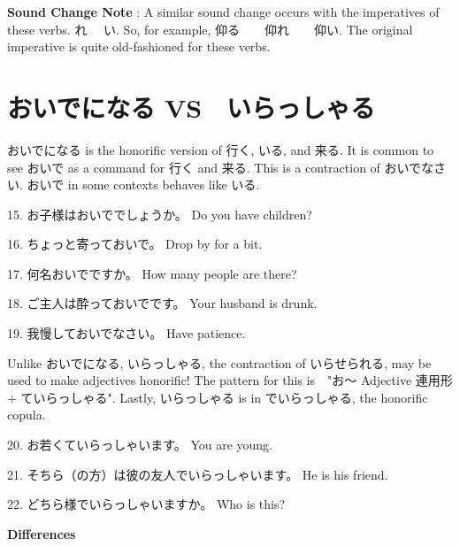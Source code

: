 \par{\textbf{Sound Change Note }: A similar sound change occurs with the imperatives of these verbs. れ \textrightarrow 　い. So, for example, 仰る　\textrightarrow 　仰れ　\textrightarrow 　仰い. The original imperative is quite old-fashioned for these verbs. }
      
\section{おいでになる VS　いらっしゃる}
 
\par{ おいでになる is the honorific version of 行く, いる, and 来る. It is common to see おいで as a command for 行く and 来る. This is a contraction of おいでなさい. おいで in some contexts behaves like いる. }
 
\par{15. お子様はおいででしょうか。 \hfill\break
Do you have children? }
 
\par{16. ちょっと寄っておいで。 \hfill\break
Drop by for a bit. }
 
\par{17. 何名おいでですか。 \hfill\break
How many people are there? }
 
\par{18. ご主人は酔っておいでです。 \hfill\break
Your husband is drunk. }
 
\par{19. 我慢しておいでなさい。 \hfill\break
Have patience. }
 
\par{ Unlike おいでになる, いらっしゃる, the contraction of いらせられる, may be used to make adjectives honorific! The pattern for this is　"お～ Adjective 連用形 + ていらっしゃる". Lastly, いらっしゃる is in でいらっしゃる, the honorific copula. }
 
\par{20. お若くていらっしゃいます。 \hfill\break
You are young. }

\par{21. そちら（の方）は彼の友人でいらっしゃいます。 \hfill\break
He is his friend. }
 
\par{22. どちら様でいらっしゃいますか。 \hfill\break
Who is this? }
 
\begin{center}
 \textbf{Differences }
\end{center}
 
